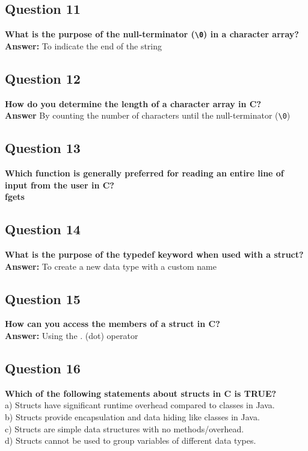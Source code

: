 \documentclass[11pt,parskip]{scrartcl}
\begin{document}
\subsection*{Question 11}
\textbf{What is the purpose of the null-terminator (\texttt{\textbackslash0}) in a character array?} \\
\textbf{Answer:} To indicate the end of the string

\subsection*{Question 12} 
\textbf{How do you determine the length of a character array in C?} \\
\textbf{Answer} By counting the number of characters until the null-terminator (\texttt{\textbackslash0})

\subsection*{Question 13}
\textbf{Which function is generally preferred for reading an entire line of input from the user in C?} \\
\textbf{fgets}

\subsection*{Question 14} 
\textbf{What is the purpose of the typedef keyword when used with a struct?} \\
\textbf{Answer:} To create a new data type with a custom name

\subsection*{Question 15} 
\textbf{How can you access the members of a struct in C?} \\
\textbf{Answer:} Using the . (dot) operator

\subsection*{Question 16} 
\textbf{Which of the following statements about structs in C is TRUE?} \\

a) Structs have significant runtime overhead compared to classes in Java. \\
b) Structs provide encapsulation and data hiding like classes in Java. \\
c) Structs are simple data structures with no methods/overhead. \\
d) Structs cannot be used to group variables of different data types. \\
\end{document}
